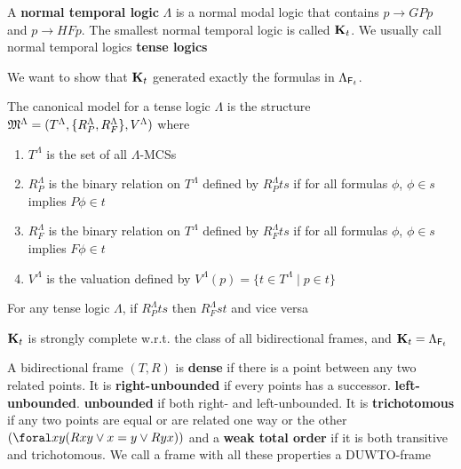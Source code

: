 \documentclass[11pt]{article}
\begin{document}
\begin{definition}[]
A \textbf{normal temporal logic} \(\Lambda\) is a normal modal logic that contains \(p\to
   GPp\) and \(p\to HF p\). The smallest normal temporal logic is called
\(\operatorname{\textbf{K}}_t\). We usually call normal temporal logics \textbf{tense logics}
\end{definition}

We want to show that \(\operatorname{\textbf{K}}_t\) generated exactly the formulas in
\(\Lambda_{\textsf{F}_t}\).

\begin{definition}[]
The canonical model for a tense logic \(\Lambda\) is the structure
\(\mathfrak{M}^\Lambda=(T^\Lambda,\{R_P^\Lambda,R_F^\Lambda\},V^\Lambda)\) where
\begin{enumerate}
\item \(T^\Lambda\) is the set of all \(\Lambda\)-MCSs
\item \(R_P^\Lambda\) is the binary relation on \(T^\Lambda\) defined by
\(R_P^\Lambda ts\) if for all formulas \(\phi\), \(\phi\in s\) implies \(P\phi\in t\)
\item \(R_F^\Lambda\) is the binary relation on \(T^\Lambda\) defined by
\(R_F^\Lambda ts\) if for all formulas \(\phi\), \(\phi\in s\) implies \(F\phi\in t\)
\item \(V^\Lambda\) is the valuation defined by \(V^\Lambda(p)=\{t\in T^\Lambda\mid
      p\in t\}\)
\end{enumerate}
\end{definition}

\begin{lemma}[]
For any tense logic \(\Lambda\), if \(R_P^\Lambda ts\) then \(R_F^\Lambda st\) and vice versa
\end{lemma}

\begin{corollary}[]
\(\operatorname{\textbf{K}}_t\) is strongly complete w.r.t. the class of all bidirectional frames,
and \(\operatorname{\textbf{K}}_t=\Lambda_{\textsf{F}_t}\)
\end{corollary}

\begin{definition}[]
A bidirectional frame \((T,R)\) is \textbf{dense} if there is a point between any two
related points. It is \textbf{right-unbounded} if every points has a successor.
\textbf{left-unbounded}. \textbf{unbounded} if both right- and left-unbounded. It is
\textbf{trichotomous} if any two points are equal or are related one way or the other
\((\foral xy(Rxy \vee x=y\vee Ryx))\) and a \textbf{weak total order} if it is both
transitive and trichotomous. We call a frame with all these properties a DUWTO-frame
\end{definition}
\end{document}
